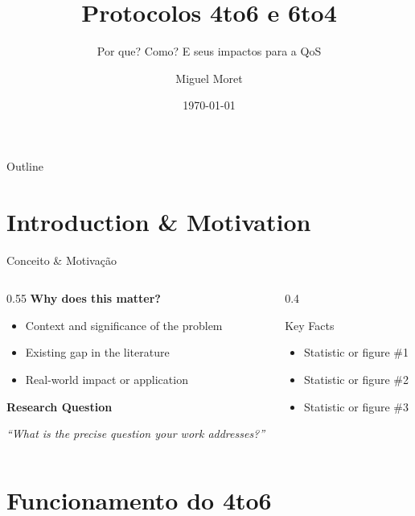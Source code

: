 \documentclass[aspectratio=169]{beamer}
\title[Short Title]{Protocolos 4to6 e 6to4}
\subtitle{Por que? Como? E seus impactos para a QoS}
\author[A. Author]{Miguel Moret}
\institute[University]{FCT-UNESP}
\date{\today}
\begin{document}
\begin{frame}
  \titlepage
\end{frame}

\begin{frame}{Outline}
  \tableofcontents
\end{frame}

\section{Introduction \& Motivation}

\begin{frame}{Conceito \& Motivação}
  \begin{columns}[T]
    \begin{column}{0.55\textwidth}
      \textbf{Why does this matter?}
      \begin{itemize}
        \item Context and significance of the problem
        \item Existing gap in the literature
        \item Real-world impact or application
      \end{itemize}
      \vspace{0.8em}
      \textbf{Research Question}
      \begin{alertblock}{}
        \centering\textit{``What is the precise question your work addresses?''}
      \end{alertblock}
    \end{column}
    \begin{column}{0.4\textwidth}
      \begin{block}{Key Facts}
        \begin{itemize}
          \item Statistic or figure \#1
          \item Statistic or figure \#2
          \item Statistic or figure \#3
        \end{itemize}
      \end{block}
    \end{column}
  \end{columns}
\end{frame}


\section{Funcionamento do 4to6}
\end{document}
